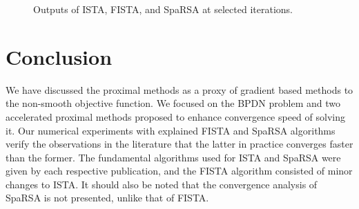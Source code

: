 \documentclass[10pt]{article} %
\begin{document}
\begin{figure}[h]
    \caption{Outputs of ISTA, FISTA, and SpaRSA at selected iterations.}
    \label{fig:combined}
\end{figure}

\section{Conclusion}
We have discussed the proximal methods as a proxy of gradient based methods to the non-smooth objective function. We focused on the BPDN problem and two accelerated proximal methods proposed to enhance convergence speed of solving it. Our numerical experiments with explained FISTA \citep{beck2009fast} and SpaRSA \cite{wright2009sparse} algorithms verify the observations in the literature \citep{becker2011nesta, hager2011gradient} that the latter in practice converges faster than the former. The fundamental algorithms used for ISTA and SpaRSA were given by each respective publication, and the FISTA algorithm consisted of minor changes to ISTA. It should also be noted that the convergence analysis of SpaRSA is not presented, unlike that of FISTA.



\end{document}
